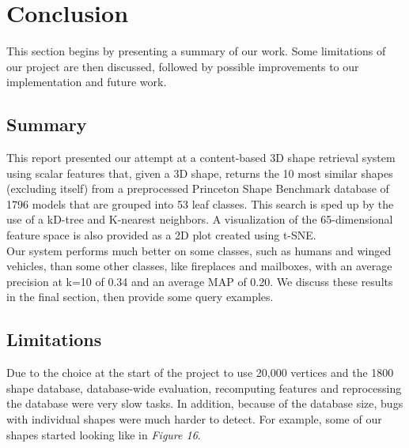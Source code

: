 \documentclass{bigdata}
\begin{document}
\section{Conclusion}
This section begins by presenting a summary of our work. Some limitations of our project are then discussed, followed by possible improvements to our implementation and future work.
\subsection{Summary}
This report presented our attempt at a content-based 3D shape retrieval system using scalar features that, given a 3D shape, returns the 10 most similar shapes (excluding itself) from a preprocessed Princeton Shape Benchmark database of 1796 models that are grouped into 53 leaf classes. This search is sped up by the use of a kD-tree and K-nearest neighbors. A visualization of the 65-dimensional feature space is also provided as a 2D plot created using t-SNE. \\
Our system performs much better on some classes, such as humans and winged vehicles, than some other classes, like fireplaces and mailboxes, with an average precision at k=10 of 0.34 and an average MAP of 0.20. We discuss these results in the final section, then provide some query examples.

\subsection{Limitations}

Due to the choice at the start of the project to use 20,000 vertices and the 1800 shape database, database-wide evaluation, recomputing features and reprocessing the database were very slow tasks. In addition, because of the database size, bugs with individual shapes were much harder to detect. For example, some of our shapes started looking like in \textit{Figure 16}.
\end{document}
